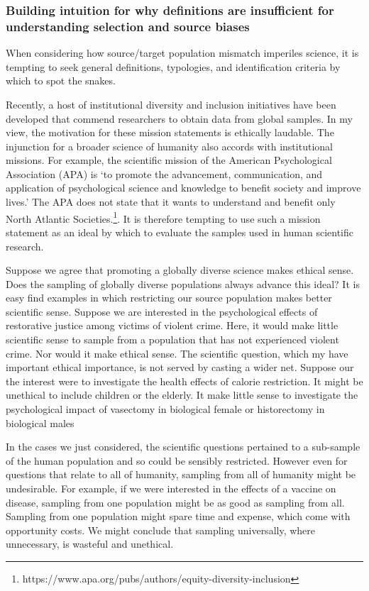 \documentclass[
  single column]{article}
\begin{document}
\subsubsection{Building intuition for why definitions are insufficient
for understanding selection and source
biases}\label{building-intuition-for-why-definitions-are-insufficient-for-understanding-selection-and-source-biases}

When considering how source/target population mismatch imperiles
science, it is tempting to seek general definitions, typologies, and
identification criteria by which to spot the snakes.

Recently, a host of institutional diversity and inclusion initiatives
have been developed that commend researchers to obtain data from global
samples. In my view, the motivation for these mission statements is
ethically laudable. The injunction for a broader science of humanity
also accords with institutional missions. For example, the scientific
mission of the American Psychological Association (APA) is `to promote
the advancement, communication, and application of psychological science
and knowledge to benefit society and improve lives.' The APA does not
state that it wants to understand and benefit only North Atlantic
Societies.\footnote{https://www.apa.org/pubs/authors/equity-diversity-inclusion}.
It is therefore tempting to use such a mission statement as an ideal by
which to evaluate the samples used in human scientific research.

Suppose we agree that promoting a globally diverse science makes ethical
sense. Does the sampling of globally diverse populations always advance
this ideal? It is easy find examples in which restricting our source
population makes better scientific sense. Suppose we are interested in
the psychological effects of restorative justice among victims of
violent crime. Here, it would make little scientific sense to sample
from a population that has not experienced violent crime. Nor would it
make ethical sense. The scientific question, which my have important
ethical importance, is not served by casting a wider net. Suppose our
the interest were to investigate the health effects of calorie
restriction. It might be unethical to include children or the elderly.
It make little sense to investigate the psychological impact of
vasectomy in biological female or historectomy in biological males

In the cases we just considered, the scientific questions pertained to a
sub-sample of the human population and so could be sensibly restricted.
However even for questions that relate to all of humanity, sampling from
all of humanity might be undesirable. For example, if we were interested
in the effects of a vaccine on disease, sampling from one population
might be as good as sampling from all. Sampling from one population
might spare time and expense, which come with opportunity costs. We
might conclude that sampling universally, where unnecessary, is wasteful
and unethical.
\end{document}
